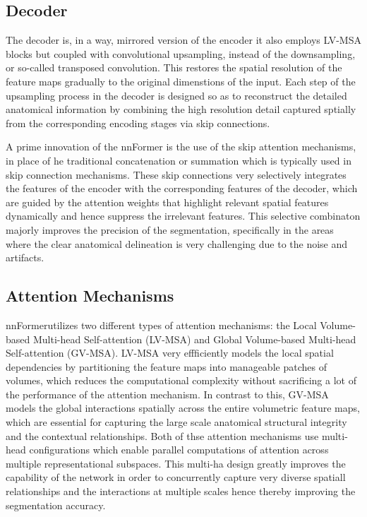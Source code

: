 \subsection{Decoder}
The decoder is, in a way, mirrored version of the encoder it also employs LV-MSA blocks but coupled with convolutional upsampling, instead of the downsampling, or so-called transposed convolution. This restores the spatial resolution of the feature maps gradually to the original dimenstions of the input. Each step of the upsampling process in the decoder is designed so as to reconstruct the detailed anatomical information by combining the high resolution detail captured sptially from the corresponding encoding stages via skip connections. 

A prime innovation of the nnFormer is the use of the skip attention mechanisms, in place of he traditional concatenation or summation which is typically used in skip connection mechanisms. These skip connections very selectively integrates the features of the encoder with the corresponding features of the decoder, which are guided by the attention weights that highlight relevant spatial features dynamically and hence suppress the irrelevant features. This selective combinaton majorly improves the precision of the segmentation, specifically in the areas where the clear anatomical delineation is very challenging due to the noise and artifacts.

\subsection{Attention Mechanisms}
nnFormerutilizes two different types of attention mechanisms: the Local Volume-based Multi-head Self-attention (LV-MSA) and Global Volume-based Multi-head Self-attention (GV-MSA). LV-MSA very effficiently models the local spatial dependencies by partitioning the feature maps into manageable patches of volumes, which reduces the computational complexity without sacrificing a lot of the performance of the attention mechanism. In contrast to this, GV-MSA models the global interactions spatially across the entire volumetric feature maps, which are essential for capturing the large scale anatomical structural integrity and the contextual relationships. Both of thse attention mechanisms use multi-head configurations which enable parallel computations of attention across multiple representational subspaces. This multi-ha design greatly improves the capability of the network in order to concurrently capture very diverse spatiall relationships and the interactions at multiple scales hence thereby improving the segmentation accuracy.

